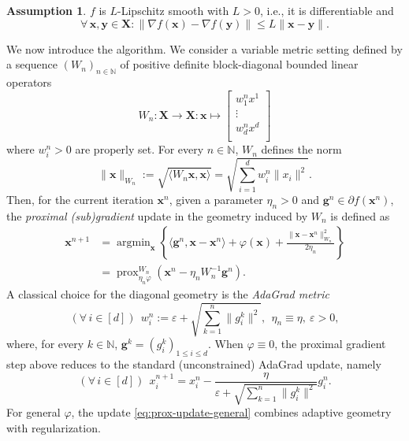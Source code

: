 \documentclass[11pt]{article}
\theoremstyle{plain}
\theoremstyle{definition}
\newtheorem{assumption}[theorem]{Assumption}
\theoremstyle{remark}
\newcommand{\norm}[1]{\lVert{#1}\rVert}
\newcommand{\scalarp}[1]{\langle{#1}\rangle}
\DeclareMathOperator*{\argmin}{argmin}
\DeclareMathOperator{\prox}{prox}
\newcommand{\bHH}{\bm{X}}
\newcommand{\x}{x}
\newcommand{\m}{d}
\newcommand{\bx}{\bm{x}}
\newcommand{\by}{\bm{y}}
\newcommand{\buu}{\bm{g}}
\newcommand{\uu}{g}
\newcommand{\w}{w}
\newcommand{\iter}{n}
\newcommand{\ite}{k}
\newcommand{\N}{\mathbb{N}}
\newcommand{\reg}{\varphi}
\newcommand{\W}{W}
\begin{document}
\begin{assumption}\label{ass:2}
$f$ is $L$-Lipschitz smooth with $L>0$, i.e., it is differentiable and
\begin{equation*}
    \forall\,\bx,\by\in \bHH\colon \norm{\nabla f(\bx)-\nabla f(\by)}\leq L\norm{\bx-\by}.
\end{equation*}
\end{assumption}
\noindent
We now introduce the algorithm.
We consider a variable metric setting defined by a sequence $(\W_\iter)_{\iter\in \N}$ of positive definite block-diagonal bounded linear operators
\begin{equation*}
\W_\iter\colon \bHH\to \bHH\colon \bx\mapsto 
\begin{bmatrix}
\w_1^n \x^1\\
\vdots\\
\w_\m^n \x^\m\\
\end{bmatrix}
\end{equation*}
where $\w_i^\iter>0$ are properly set.
For every $\iter\in \N$, $\W_\iter$ defines the norm
\begin{equation}
    \|\bx\|_{\W_\iter} := \sqrt{\scalarp{\W_\iter \bx, \bx}} = \sqrt{\sum_{i=1}^\m \w_i^{\iter} \norm{x_i}^2}.
\end{equation}
\noindent
Then, for the current iteration $\bx^\iter$, given a parameter $\eta_\iter > 0$ and 
 $\buu^\iter\in \partial f(\bx^\iter)$, the \emph{proximal (sub)gradient} update in the geometry induced by $\W_\iter$ is defined as
 \begin{align}
    \label{eq:prox-update-general}
    \nonumber\bx^{\iter+1} \!&= 
    \argmin_{\bx}\left\{\scalarp{\buu^\iter, \bx-\bx^\iter} + \reg(\bx) + \frac{\norm{\bx-\bx^\iter}_{\W_\iter}^2}{2\eta_\iter} \right\}\\
    &=\prox^{\W_n}_{\eta_\iter \reg}(\bx^\iter - \eta_\iter \W_\iter^{-1}\buu^\iter).
\end{align}
A classical choice for the diagonal geometry is the \emph{AdaGrad metric}
\begin{equation*}
(\forall\,i\in [\m])\  \   \w_{i}^\iter
    := \varepsilon+\sqrt{\sum_{\ite=1}^\iter \norm{\uu^\ite_{i}}^2},\ \ \eta_\iter \equiv \eta,\ \varepsilon > 0,
\end{equation*}
where, for every $\ite\in \N$, $\buu^\ite = (\uu_i^\ite)_{1\leq i\leq \m}$.
When $\reg \equiv 0$, the proximal gradient step above reduces to the standard (unconstrained) AdaGrad update, namely
\begin{equation}
(\forall\,i\in [\m])\ \    \x_i^{\iter+1} = \x_{i}^\iter - \frac{\eta}{\varepsilon +   \sqrt{\sum_{\ite=1}^\iter \norm{\uu_{i}^\ite}^2}} \uu_{i}^\iter.
\end{equation}
For general $\reg$, the update \eqref{eq:prox-update-general} combines adaptive geometry with regularization.\\
\end{document}
